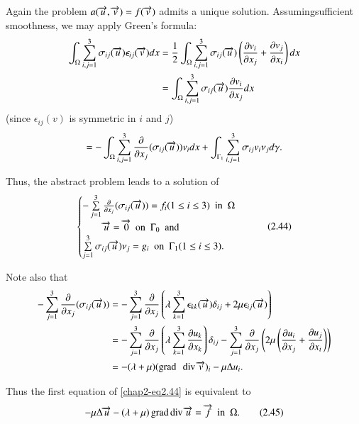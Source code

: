 \begin{example}
Again the problem $a(\overrightarrow{u},\overrightarrow{v})=f(\overrightarrow{v})$ admits a unique
solution. Assuming\pageoriginale sufficient smoothness, we may apply
Green's formula:
\begin{align*}
\int_{\Omega}\sum^{3}_{i,j=1}\sigma_{ij}(\overrightarrow{u})\epsilon_{ij}(\overrightarrow{v})dx
&=
\frac{1}{2}\int_{\Omega}\sum^{3}_{i,j=1}\sigma_{ij}(\overrightarrow{u})\left(\frac{\partial
  v_{i}}{\partial x_{j}}+\frac{\partial v_{j}}{\partial x_{i}}\right)dx\\
&= \int_{\Omega}\sum^{3}_{i,j=1}\sigma_{ij}(\overrightarrow{u})\frac{\partial v_{i}}{\partial x_{j}}dx
\end{align*}
(since $\epsilon_{ij}(v)$ is symmetric in $i$ and $j$)
$$
=-\int_{\Omega}\sum^{3}_{i,j=1}\frac{\partial}{\partial x_{j}}(\sigma_{ij}(\overrightarrow{u}))v_{i}dx+\int_{\Gamma_{1}}\sum^{3}_{i,j=1}\sigma_{ij}v_{i}\nu_{j}d\gamma.
$$

Thus, the abstract problem leads to a solution of
\begin{equation*}
\begin{cases}
-\sum\limits^{3}_{j=1}\frac{\partial}{\partial x_{j}}(\sigma_{ij}(\overrightarrow{u}))=f_{i}(1\leq
i\leq 3)\text{~ in~ }\Omega\\
\qquad \overrightarrow{u}=\overrightarrow{0}\text{~ on~ }\Gamma_{0}\text{~ and}\\
\sum\limits^{3}_{j=1}\sigma_{ij}(\overrightarrow{u})\nu_{j}=g_{i}\text{~ on~
}\Gamma_{1}(1\leq i\leq 3).
\end{cases}\tag{2.44}\label{chap2-eq2.44}
\end{equation*}

Note also that
{\fontsize{10}{12}\selectfont
\begin{align*}
-\sum^{3}_{j=1}\frac{\partial}{\partial x_{j}}(\sigma_{ij}(\overrightarrow{u})) & =
-\sum^{3}_{j=1}\frac{\partial}{\partial x_{j}}\left(\lambda
\sum^{3}_{k=1}\epsilon_{kk}(\overrightarrow{u})\delta_{ij}+2\mu
\epsilon_{ij}(\overrightarrow{u})\right)\\ 
&= -\sum^{3}_{j=1}\frac{\partial}{\partial
x_{j}}\left(\lambda\sum^{3}_{k=1}\frac{\partial u_{k}}{\partial
x_{k}}\right)\delta_{ij}-\sum^{3}_{j=1}\frac{\partial}{\partial
x_{j}}\left(2\mu\left(\frac{\partial u_{i}}{\partial x_{j}}+\frac{\partial u_{j}}{\partial
x_{i}}\right)\right)\\
&= -(\lambda+\mu)(\text{grad~ }\operatorname{div}\overrightarrow{v})_{i}-\mu\Delta u_{i}. 
\end{align*}}

Thus the first equation of \eqref{chap2-eq2.44} is equivalent to
\begin{equation*}
-\mu\Delta \overrightarrow{u}-(\lambda+\mu)\operatorname{grad} \operatorname{div} \overrightarrow{u}=\overrightarrow{f}\text{~ in~
}\Omega.\tag{2.45}\label{chap2-eq2.45}
\end{equation*}


\end{example}
